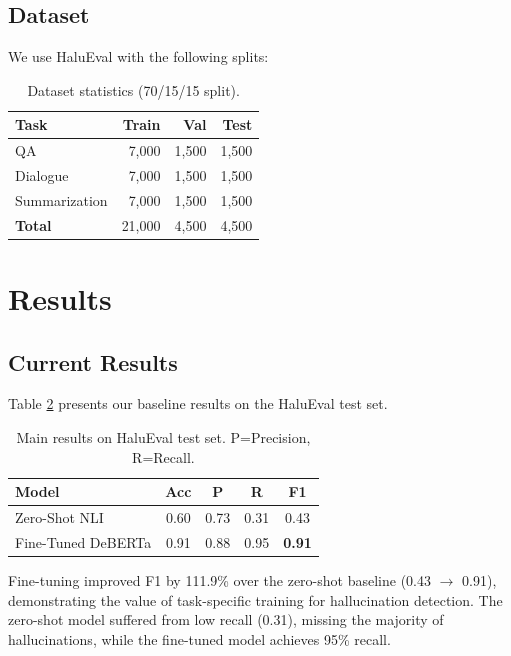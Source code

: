 \documentclass[11pt]{article}
\begin{document}
\subsection{Dataset}

We use HaluEval \cite{li2023halueval} with the following splits:

\begin{table}[h]
\centering
\small
\begin{tabular}{lrrr}
\toprule
\textbf{Task} & \textbf{Train} & \textbf{Val} & \textbf{Test} \\
\midrule
QA & 7,000 & 1,500 & 1,500 \\
Dialogue & 7,000 & 1,500 & 1,500 \\
Summarization & 7,000 & 1,500 & 1,500 \\
\midrule
\textbf{Total} & 21,000 & 4,500 & 4,500 \\
\bottomrule
\end{tabular}
\caption{Dataset statistics (70/15/15 split).}
\label{tab:dataset}
\end{table}

\section{Results}

\subsection{Current Results}

Table \ref{tab:main_results} presents our baseline results on the HaluEval test set.

\begin{table}[h]
\centering
\small
\begin{tabular}{lcccc}
\toprule
\textbf{Model} & \textbf{Acc} & \textbf{P} & \textbf{R} & \textbf{F1} \\
\midrule
Zero-Shot NLI & 0.60 & 0.73 & 0.31 & 0.43 \\
Fine-Tuned DeBERTa & 0.91 & 0.88 & 0.95 & \textbf{0.91} \\
\bottomrule
\end{tabular}
\caption{Main results on HaluEval test set. P=Precision, R=Recall.}
\label{tab:main_results}
\end{table}

Fine-tuning improved F1 by 111.9\% over the zero-shot baseline (0.43 $\rightarrow$ 0.91), demonstrating the value of task-specific training for hallucination detection. The zero-shot model suffered from low recall (0.31), missing the majority of hallucinations, while the fine-tuned model achieves 95\% recall.
\end{document}
